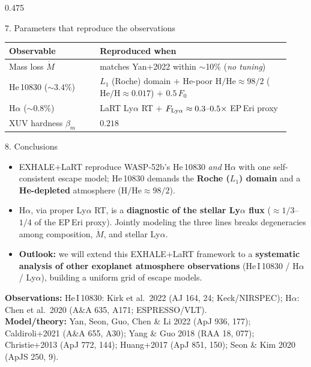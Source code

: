 \documentclass[final]{beamer}
\newlength{\colht}\setlength{\colht}{0.848\paperheight}
\newcommand{\Fo}{F_{0}}
\newcommand{\Mdot}{\dot{M}}
\begin{document}
\begin{frame}[t]{}
\begin{columns}[t]
\begin{column}{0.475\paperwidth}
\begin{minipage}[t][\colht][s]{\linewidth}
\begin{block}{7. Parameters that reproduce the observations}
\centering
\begin{tcolorbox}[colback=accent!10,colframe=accent,boxrule=1.2pt,sharp corners,
  left=4mm,right=4mm,top=3mm,bottom=3mm,width=\linewidth]
\renewcommand{\arraystretch}{1.15}
\begin{tabular}{@{}p{0.30\linewidth}p{0.63\linewidth}@{}}
\toprule
\textbf{Observable} & \textbf{Reproduced when} \\
\midrule
Mass loss $\Mdot$ & matches Yan+2022 within $\sim$10\% (\emph{no tuning}) \\
He\,10830 ($\sim\!3.4\%$) & $L_1$ (Roche) domain $+$ He-poor
  $\mathrm{H/He}\approx98/2$ ($\mathrm{He/H}\approx0.017$) $+$ $0.5\,\Fo$ \\
H$\alpha$ ($\sim\!0.8\%$) & LaRT Ly$\alpha$ RT $+$
  $F_{\rm Ly\alpha}\approx0.3\text{--}0.5\times$ EP\,Eri proxy \\
XUV hardness $\beta_m$ & $0.218$ \\
\bottomrule
\end{tabular}
\end{tcolorbox}
\end{block}

\vfill

\begin{block}{8. Conclusions}
\begin{itemize}
\item EXHALE$+$LaRT reproduce WASP-52b's He\,10830 \emph{and} H$\alpha$ with one
  self-consistent escape model; He\,10830 demands the \textbf{Roche ($L_1$) domain}
  and a \textbf{He-depleted} atmosphere ($\mathrm{H/He}\approx98/2$).
\item H$\alpha$, via proper Ly$\alpha$ RT, is a \textbf{diagnostic of the stellar
  Ly$\alpha$ flux} ($\approx1/3$--$1/4$ of the EP\,Eri proxy). Jointly modeling the
  three lines breaks degeneracies among composition, $\Mdot$, and stellar Ly$\alpha$.
\item \textbf{Outlook:} we will extend this EXHALE$+$LaRT framework to a
  \textbf{systematic analysis of other exoplanet atmosphere observations}
  (He\,I\,10830 / H$\alpha$ / Ly$\alpha$), building a uniform grid of escape models.
\end{itemize}
\vspace{1mm}
{\scriptsize\textbf{Observations:} He\,I\,10830: Kirk et al.\ 2022 (AJ 164, 24;
Keck/NIRSPEC); H$\alpha$: Chen et al.\ 2020 (A\&A 635, A171; ESPRESSO/VLT).\\
\textbf{Model/theory:} Yan, Seon, Guo, Chen \& Li 2022 (ApJ 936, 177);
Caldiroli+2021 (A\&A 655, A30); Yang \& Guo 2018 (RAA 18, 077); Christie+2013
(ApJ 772, 144); Huang+2017 (ApJ 851, 150); Seon \& Kim 2020 (ApJS 250, 9).}
\end{block}

\end{minipage}
\end{column}
\end{columns}
\end{frame}
\end{document}
